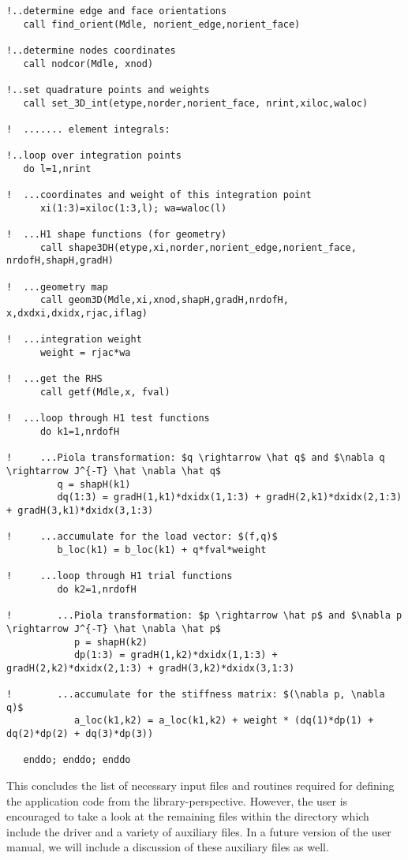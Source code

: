 \begin{itemize}
{\begin{lstlisting}[mathescape,caption=\file{POISSON/GALERKIN/}\routine{elem} routine]
!..determine edge and face orientations
   call find_orient(Mdle, norient_edge,norient_face)
   
!..determine nodes coordinates
   call nodcor(Mdle, xnod)
   
!..set quadrature points and weights
   call set_3D_int(etype,norder,norient_face, nrint,xiloc,waloc)

!  ....... element integrals:

!..loop over integration points
   do l=1,nrint

!  ...coordinates and weight of this integration point
      xi(1:3)=xiloc(1:3,l); wa=waloc(l)

!  ...H1 shape functions (for geometry)
      call shape3DH(etype,xi,norder,norient_edge,norient_face, nrdofH,shapH,gradH)

!  ...geometry map
      call geom3D(Mdle,xi,xnod,shapH,gradH,nrdofH, x,dxdxi,dxidx,rjac,iflag)

!  ...integration weight
      weight = rjac*wa

!  ...get the RHS
      call getf(Mdle,x, fval)

!  ...loop through H1 test functions
      do k1=1,nrdofH

!     ...Piola transformation: $q \rightarrow \hat q$ and $\nabla q \rightarrow J^{-T} \hat \nabla \hat q$
         q = shapH(k1)
         dq(1:3) = gradH(1,k1)*dxidx(1,1:3) + gradH(2,k1)*dxidx(2,1:3) + gradH(3,k1)*dxidx(3,1:3)

!     ...accumulate for the load vector: $(f,q)$
         b_loc(k1) = b_loc(k1) + q*fval*weight

!     ...loop through H1 trial functions
         do k2=1,nrdofH

!        ...Piola transformation: $p \rightarrow \hat p$ and $\nabla p \rightarrow J^{-T} \hat \nabla \hat p$
            p = shapH(k2)
            dp(1:3) = gradH(1,k2)*dxidx(1,1:3) + gradH(2,k2)*dxidx(2,1:3) + gradH(3,k2)*dxidx(3,1:3)

!        ...accumulate for the stiffness matrix: $(\nabla p, \nabla q)$
            a_loc(k1,k2) = a_loc(k1,k2) + weight * (dq(1)*dp(1) + dq(2)*dp(2) + dq(3)*dp(3))

   enddo; enddo; enddo
\end{lstlisting}
	}
\end{itemize}

This concludes the list of necessary input files and routines required for defining the application code from the library-perspective. However, the user is encouraged to take a look at the remaining files within the  directory which include the driver  and a variety of auxiliary files. In a future version of the user manual, we will include a discussion of these auxiliary files as well.

